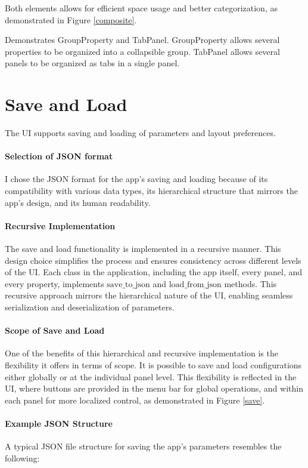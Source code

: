 Both elements allows for efficient space usage and better categorization, as demonstrated in Figure \ref{composite}.

{Demonstrates GroupProperty and TabPanel. GroupProperty allows several properties to be organized into a collapsible group. TabPanel allows several panels to be organized as tabs in a single panel.}

\section{Save and Load}

The UI supports saving and loading of parameters and layout preferences.

\paragraph{Selection of JSON format}
I chose the JSON format for the app's saving and loading because of its compatibility with various data types, its hierarchical structure that mirrors the app's design, and its human readability.

\paragraph{Recursive Implementation}
The save and load functionality is implemented in a recursive manner. This design choice simplifies the process and ensures consistency across different levels of the UI. Each class in the application, including the app itself, every panel, and every property, implements $\text{save\_to\_json}$ and $\text{load\_from\_json}$ methods. This recursive approach mirrors the hierarchical nature of the UI, enabling seamless serialization and deserialization of parameters.

\paragraph{Scope of Save and Load}
One of the benefits of this hierarchical and recursive implementation is the flexibility it offers in terms of scope. It is possible to save and load configurations either globally or at the individual panel level. This flexibility is reflected in the UI, where buttons are provided in the menu bar for global operations, and within each panel for more localized control, as demonstrated in Figure \ref{save}.

\paragraph{Example JSON Structure}
A typical JSON file structure for saving the app's parameters resembles the following:

